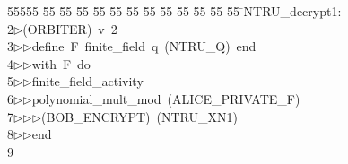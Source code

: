 %
%
\begin{tabbing}
55555 \= 55 \= 55 \= 55 \= 55 \= 55 \= 55 \= 55 \= 55 \= 55 \= 55 \= 55 \= 55 \= \>NTRU\_decrypt1:\\[0pt]
2\>$\triangleright$\>(ORBITER)\ v\ 2\ \\[0pt]
3\>$\triangleright$\>$\triangleright$\>define\ F\ finite\_field\ q\ (NTRU\_Q)\ end\ \\[0pt]
4\>$\triangleright$\>$\triangleright$\>with\ F\ do\ \\[0pt]
5\>$\triangleright$\>$\triangleright$\>finite\_field\_activity\ \\[0pt]
6\>$\triangleright$\>$\triangleright$\>polynomial\_mult\_mod\ (ALICE\_PRIVATE\_F)\ \\[0pt]
7\>$\triangleright$\>$\triangleright$\>$\triangleright$\>(BOB\_ENCRYPT)\ (NTRU\_XN1)\ \\[0pt]
8\>$\triangleright$\>$\triangleright$\>end\\[0pt]
9\>\end{tabbing}
